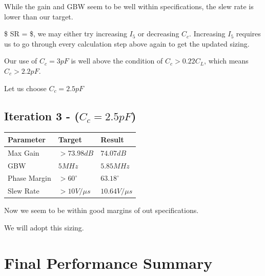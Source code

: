 \documentclass[
]{article}
\newcounter{none} %
\begin{document}
While the gain and GBW seem to be well within specifications, the slew
rate is lower than our target.

\$ SR =  \$, we may either try increasing \(I_5\) or
decreasing \(C_{c}\). Increasing \(I_5\) requires us to go through every
calculation step above again to get the updated sizing.

Our use of \(C_c = 3pF\) is well above the condition of
\(C_c > 0.22C_L\), which means \(C_c > 2.2pF\).

Let us choose \(C_c = 2.5pF\)

\subsection{\texorpdfstring{Iteration 3 -
(\(C_c = 2.5pF\))}{Iteration 3 - (C\_c = 2.5pF)}}\label{iteration-3---c_c-2.5pf}

{\def\LTcaptype{none} %
\begin{longtable}[]{@{}lll@{}}
\toprule\noalign{}
Parameter & Target & Result \\
\midrule\noalign{}
\endhead
\bottomrule\noalign{}
\endlastfoot
Max Gain & \(> 73.98 dB\) & \(74.07 dB\) \\
GBW & \(5 MHz\) & \(5.85 MHz\) \\
Phase Margin & \(>60^{\circ}\) & \(63.18^{\circ}\) \\
Slew Rate & \(>10V/{\mu}s\) & \(10.64V/{\mu}s\) \\
\end{longtable}
}

Now we seem to be within good margins of out specifications.

We will adopt this sizing.

\section{Final Performance Summary}\label{final-performance-summary}
\end{document}
